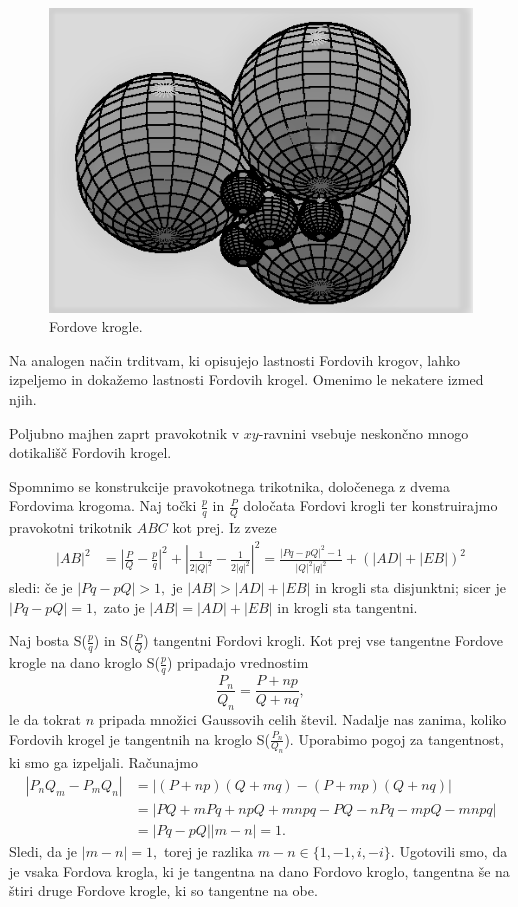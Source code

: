 \documentclass[mat1]{fmfdelo}
\begin{document}
\begin{figure}[h!]
\begin{center}
\includegraphics[scale=0.9]{fordove_krogle1.png}
\caption{Fordove krogle.}
\end{center}
\end{figure}

Na analogen način trditvam, ki opisujejo lastnosti Fordovih krogov, lahko izpeljemo in dokažemo lastnosti Fordovih krogel. Omenimo le nekatere izmed njih.

Poljubno majhen zaprt pravokotnik v $xy$-ravnini vsebuje neskončno mnogo dotikališč Fordovih krogel.

Spomnimo se konstrukcije pravokotnega trikotnika, določenega z dvema Fordovima krogoma. Naj točki $\frac{p}{q}$ in $\frac{P}{Q}$ določata Fordovi krogli ter konstruirajmo pravokotni trikotnik $ABC$ kot prej. Iz zveze
\begin{align*}
|AB|^2 
  &= \left |\frac{P}{Q} - \frac{p}{q} \right|^2 + \left |\frac{1}{2|Q|^2} - \frac{1}{2|q|^2} \right|^2 = \frac{|Pq-pQ|^2-1}{|Q|^2|q|^2} + (|AD| + |EB|)^2
\end{align*}
sledi:
če je $|Pq-pQ|>1,$ je $|AB|>|AD|+|EB|$ in krogli sta disjunktni;
sicer je $|Pq-pQ|=1,$ zato je $|AB|=|AD|+|EB|$ in krogli sta tangentni.

Naj bosta S($\frac{p}{q}$) in S($\frac{P}{Q}$) tangentni Fordovi krogli. Kot prej vse tangentne Fordove krogle na dano kroglo S($\frac{p}{q}$) pripadajo vrednostim
\begin{equation}
\frac{P_n}{Q_n} = \frac{P+np}{Q+nq},
\end{equation}
le da tokrat $n$ pripada množici Gaussovih celih števil. 
Nadalje nas zanima, koliko Fordovih krogel je tangentnih na kroglo S($\frac{P_n}{Q_n}$).
Uporabimo pogoj za tangentnost, ki smo ga izpeljali. Računajmo
\begin{align} 
|P_{n}Q_{m} - P_{m}Q_{n}| 
  &= |(P+np)(Q+mq) - (P+mp)(Q+nq)| \nonumber \\
  &= |PQ+mPq+npQ+mnpq-PQ-nPq-mpQ-mnpq| \nonumber \\
  &= |Pq-pQ| |m-n| = 1.
\end{align}
%
Sledi, da je $|m-n|=1,$ torej je razlika $m-n \in \{1, -1, i, -i \}.$ Ugotovili smo, da je vsaka Fordova krogla, ki je tangentna na dano Fordovo kroglo, tangentna še na štiri druge Fordove krogle, ki so tangentne na obe.
\end{document}
